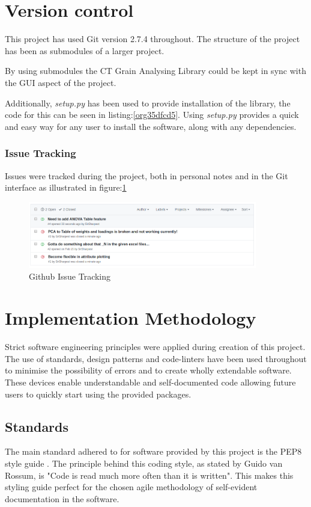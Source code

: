 \documentclass[11pt]{report}
\begin{document}
\section{Version control}
\label{sec:org4df54ab}
This project has used Git version 2.7.4 throughout. The structure of the project has been as submodules of a larger project.

By using submodules the CT Grain Analysing Library could be kept in sync with the GUI aspect of the project.

Additionally, \emph{setup.py} has been used to provide installation of the library, the code for this can be seen in listing:\ref{org35dfcd5}. Using \emph{setup.py} provides a quick and easy way for any user to install the software, along with any dependencies.

\subsubsection{Issue Tracking}
\label{sec:orgef7ce9c}
Issues were tracked during the project, both in personal notes and in the Git interface as illustrated in figure:\ref{fig:orgc43c527}
\begin{figure}[htbp]
\centering
\includegraphics[width=10cm]{./images/github.png}
\caption{\label{fig:orgc43c527}
Github Issue Tracking}
\end{figure}

\section{Implementation Methodology}
\label{sec:org5940279}
Strict software engineering principles were applied during creation of this project. The use of standards, design patterns and code-linters have been used throughout to minimise the possibility of errors and to create wholly extendable software. These devices enable understandable and self-documented code allowing future users to quickly start using the provided packages.
\subsection{Standards}
\label{sec:org99cbbfd}
The main standard adhered to for software provided by this project is the PEP8 style guide \cite{VanRossum}. The principle behind this coding style, as stated by Guido van Rossum, is "Code is read much more often than it is written". This makes this styling guide perfect for the chosen agile methodology of self-evident documentation in the software.
\end{document}
